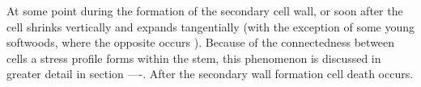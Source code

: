 At some point during the formation of the secondary cell wall, or soon after the
cell shrinks vertically and expands tangentially \citep{Boyd_1972} (with the exception of
some young softwoods, where the opposite occurs \citep{jacobs1945l}). Because of the connectedness
between cells a stress profile forms within the stem, this phenomenon is discussed
in greater detail in section ----. After the secondary wall formation cell death
occurs.